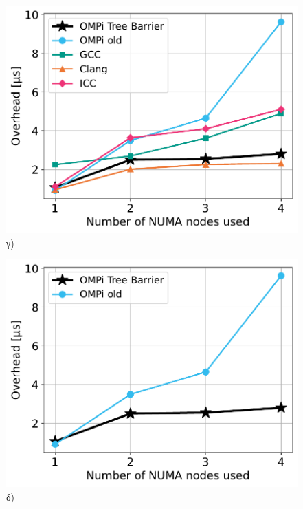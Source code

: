 \begin{figure}[htbp]
\begin{minipage}{0.5\textwidth}
        \centering
        \includegraphics[width=1\textwidth]{Figures/parade-epcc/sockets_tpn-16_close.pdf}
        γ)
    \end{minipage}\hfill
    \begin{minipage}{0.5\textwidth}
        \centering
        \includegraphics[width=1\textwidth]{Figures/parade-epcc/ompionly_sockets_tpn-16_close.pdf}
        δ)
    \end{minipage}
    \newline
    \begin{minipage}{0.5\textwidth}
        \centering

\end{minipage}
\end{figure}

